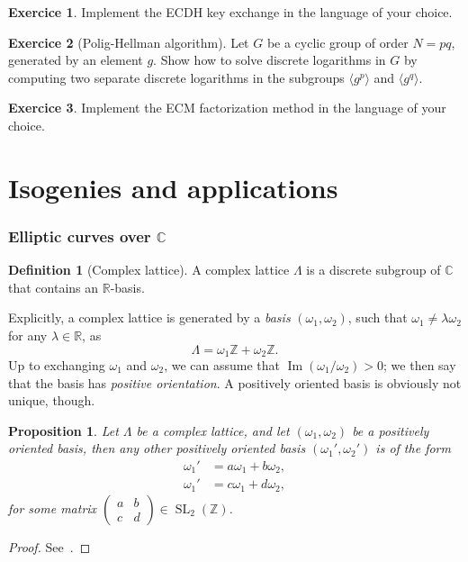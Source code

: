 \documentclass[10pt]{article}
\theoremstyle{plain}
\newtheorem{proposition}[theorem]{Proposition}
\theoremstyle{definition}
\newtheorem{definition}[theorem]{Definition}
\newtheorem{exercice}{Exercice}[part]
\DeclareMathOperator{\im}{Im}
\DeclareMathOperator{\SL}{SL}
\begin{document}
\begin{exercice}
  Implement the ECDH key exchange in the language of your choice.
\end{exercice}

\begin{exercice}[Polig-Hellman algorithm]
  Let $G$ be a cyclic group of order $N=pq$, generated by an element
  $g$. %
  Show how to solve discrete logarithms in $G$ by computing two
  separate discrete logarithms in the subgroups $〈g^p〉$ and $〈g^q〉$.
\end{exercice}

\begin{exercice}
  Implement the ECM factorization method in the language of your
  choice.
\end{exercice}


\clearpage
\part{Isogenies and applications}

\section{Elliptic curves over $ℂ$}

\begin{definition}[Complex lattice]
  A complex lattice $Λ$ is a discrete subgroup of $ℂ$ that contains an
  $ℝ$-basis.
\end{definition}

Explicitly, a complex lattice is generated by a \emph{basis}
$(ω_1,ω_2)$, such that $ω_1≠λω_2$ for any $λ∈ℝ$, as
\[Λ = ω_1ℤ + ω_2ℤ.\] %
Up to exchanging $ω_1$ and $ω_2$, we can assume that $\im(ω_1/ω_2)>0$;
we then say that the basis has \emph{positive orientation}. %
A positively oriented basis is obviously not unique, though.

\begin{proposition}
  \label{th:basis-change}
  Let $Λ$ be a complex lattice, and let $(ω_1,ω_2)$ be a positively
  oriented basis, then any other positively oriented basis
  $(ω_1',ω_2')$ is of the form
  \begin{align*}
    ω_1' &= aω_1 + bω_2,\\
    ω_1' &= cω_1 + dω_2,
  \end{align*}
  for some matrix
  $\left(\begin{smallmatrix}a&b\\c&d\end{smallmatrix}\right)∈\SL_2(ℤ)$.
\end{proposition}
\begin{proof}
  See~\cite[I, Lem.~2.4]{silverman:advanced}.
\end{proof}
\end{document}
